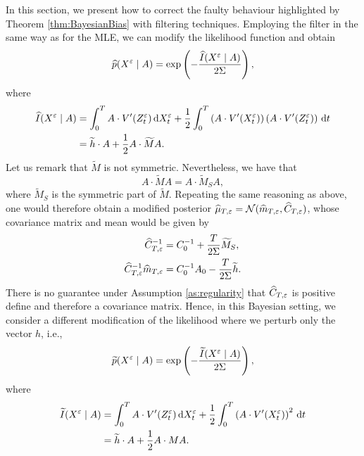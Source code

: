 \documentclass[10pt]{article}
\begin{document}
In this section, we present how to correct the faulty behaviour highlighted by Theorem \ref{thm:BayesianBias} with filtering techniques. Employing the filter in the same way as for the MLE, we can modify the likelihood function and obtain 
\begin{equation}
	\widehat p(X^\varepsilon \mid A) = \exp\left(-\frac{\widehat I(X^\varepsilon\mid A)}{2\Sigma} \right), 
\end{equation}
where 
\begin{equation}
\begin{aligned}
	\widehat I(X^\varepsilon \mid A) & = \int_0^T A \cdot V'(Z^\varepsilon_t) \,\mathrm{d} X^\varepsilon_t + \frac12 \int_0^T \left(A \cdot V'(X^\varepsilon_t)\right)\left(A \cdot V'(Z^\varepsilon_t)\right) \,\mathrm{d} t \\
	&= \widetilde h \cdot A + \frac12 A \cdot \widetilde M A.
\end{aligned}
\end{equation}
Let us remark that $\widetilde M$ is not symmetric. Nevertheless, we have that
\begin{equation}
	A \cdot \widetilde M A = A \cdot \widetilde M_S A,
\end{equation}
where $\widetilde M_S$ is the symmetric part of $\widetilde M$. Repeating the same reasoning as above, one would therefore obtain a modified posterior $\widehat \mu_{T, \varepsilon} = \mathcal N(\widehat m_{T, \varepsilon}, \widehat C_{T, \varepsilon})$, whose covariance matrix and mean would be given by
\begin{equation}
\begin{aligned}
	\widehat C_{T, \varepsilon}^{-1} &= C_0^{-1} + \frac{T}{2\Sigma} \widetilde M_S, \\
	\widehat C_{T,\varepsilon}^{-1}\widehat m_{T,\varepsilon} &= C_0^{-1}A_0 - \frac{T}{2\Sigma} \widetilde h. 
\end{aligned}	
\end{equation}
There is no guarantee under Assumption \ref{as:regularity} that $\widehat C_{T, \varepsilon}$ is positive define and therefore a covariance matrix. Hence, in this Bayesian setting, we consider a different modification of the likelihood where we perturb only the vector $h$, i.e.,
\begin{equation}
	\widetilde p(X^\varepsilon \mid A) = \exp\left(-\frac{\widetilde I(X^\varepsilon\mid A)}{2\Sigma} \right), 
\end{equation}
where 
\begin{equation}
\begin{aligned}
	\widetilde I(X^\varepsilon \mid A) & = \int_0^T A \cdot V'(Z^\varepsilon_t) \,\mathrm{d} X^\varepsilon_t + \frac12 \int_0^T \left(A \cdot V'(X^\varepsilon_t)\right)^2 \,\mathrm{d} t \\
	&= \widetilde h \cdot A + \frac12 A \cdot M A.
\end{aligned}
\end{equation}
\end{document}
